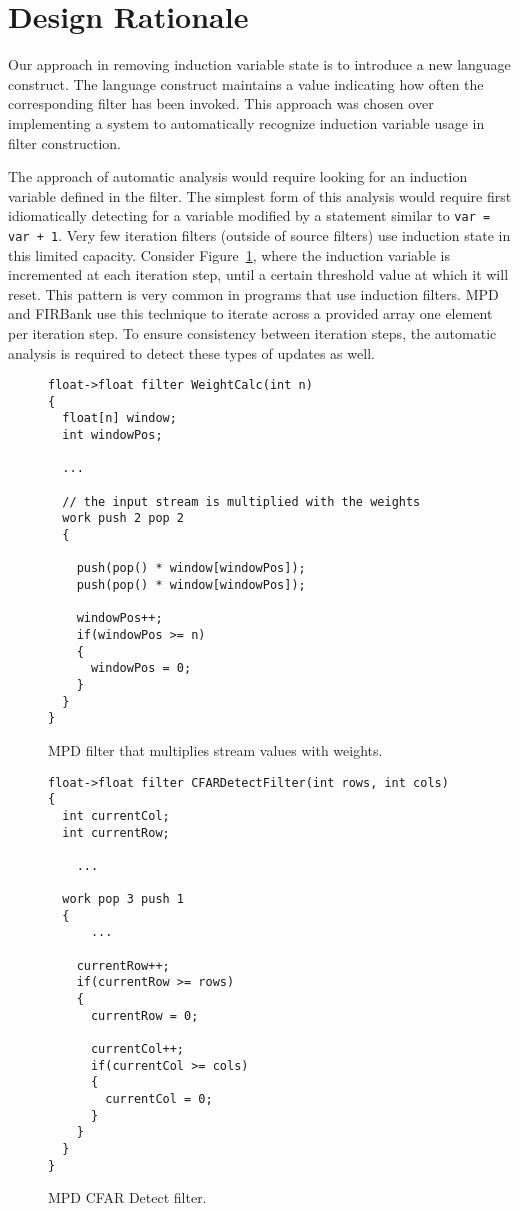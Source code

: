 \section{Design Rationale}

Our approach in removing induction variable state is to introduce a new language construct.  The language construct maintains a value indicating how often the corresponding filter has been invoked.  This approach was chosen over implementing a system to automatically recognize induction variable usage in filter construction.

The approach of automatic analysis would require looking for an induction variable defined in the filter.  The simplest form of this analysis would require first idiomatically detecting for a variable modified by a statement similar to \texttt{var = var + 1}.  Very few iteration filters (outside of source filters) use induction state in this limited capacity.  Consider Figure~\ref{fig:weight-calc}, where the induction variable is incremented at each iteration step, until a certain threshold value at which it will reset.  This pattern is very common in programs that use induction filters.  MPD and FIRBank use this technique to iterate across a provided array one element per iteration step.  To ensure consistency between iteration steps, the automatic analysis is required to detect these types of updates as well.  

\begin{figure}[t]
{\eightpoint
\begin{verbatim}
float->float filter WeightCalc(int n)
{
  float[n] window;
  int windowPos;

  ...

  // the input stream is multiplied with the weights
  work push 2 pop 2
  {

    push(pop() * window[windowPos]);
    push(pop() * window[windowPos]);

    windowPos++;
    if(windowPos >= n)
    {
      windowPos = 0;
    }
  }
}
\end{verbatim}
\caption{MPD filter that multiplies stream values with weights.\protect\label{fig:weight-calc}}}
\end{figure}

\begin{figure}[t]
{\eightpoint
\begin{verbatim}
float->float filter CFARDetectFilter(int rows, int cols)
{
  int currentCol;
  int currentRow;

    ...

  work pop 3 push 1
  {
      ...

    currentRow++;
    if(currentRow >= rows)
    {
      currentRow = 0;

      currentCol++;
      if(currentCol >= cols)
      {
        currentCol = 0;
      }
    }
  }
}
\end{verbatim}
\caption{MPD CFAR Detect filter.\protect\label{fig:cfar-detect-filter}}}
\end{figure}

